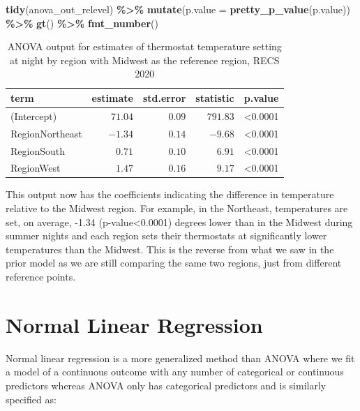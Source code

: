 \documentclass[
]{krantz}
\makeatletter
\newenvironment{Shaded}{\begin{snugshade}}{\end{snugshade}}
\newcommand{\AttributeTok}[1]{\textcolor[rgb]{0.27,0.27,0.27}{#1}}
\newcommand{\FunctionTok}[1]{\textcolor[rgb]{0.27,0.27,0.27}{\textbf{#1}}}
\newcommand{\NormalTok}[1]{#1}
\newcommand{\SpecialCharTok}[1]{\textcolor[rgb]{0.43,0.43,0.43}{\textbf{#1}}}
\newenvironment{kframe}{%
\medskip{}
\setlength{\fboxsep}{.8em}
 \def\at@end@of@kframe{}%
 \ifinner\ifhmode%
  \def\at@end@of@kframe{\end{minipage}}%
  \begin{minipage}{\columnwidth}%
 \fi\fi%
 \def\FrameCommand##1{\hskip\@totalleftmargin \hskip-\fboxsep
 \colorbox{shadecolor}{##1}\hskip-\fboxsep
     \hskip-\linewidth \hskip-\@totalleftmargin \hskip\columnwidth}%
 \MakeFramed {\advance\hsize-\width
   \@totalleftmargin\z@ \linewidth\hsize
   \@setminipage}}%
 {\par\unskip\endMakeFramed%
 \at@end@of@kframe}
\renewenvironment{Shaded}{\begin{kframe}}{\end{kframe}}
\makeatother
\begin{document}
\begin{Shaded}
\begin{Highlighting}[]
\FunctionTok{tidy}\NormalTok{(anova\_out\_relevel) }\SpecialCharTok{\%\textgreater{}\%}
  \FunctionTok{mutate}\NormalTok{(}\AttributeTok{p.value =} \FunctionTok{pretty\_p\_value}\NormalTok{(p.value)) }\SpecialCharTok{\%\textgreater{}\%}
  \FunctionTok{gt}\NormalTok{() }\SpecialCharTok{\%\textgreater{}\%}
  \FunctionTok{fmt\_number}\NormalTok{()}
\end{Highlighting}
\end{Shaded}



\begin{longtable}{lrrrl}
\caption{\label{tab:model-anova-ex-tab}ANOVA output for estimates of thermostat temperature setting at night by region with Midwest as the reference region, RECS 2020}\\
\toprule
term & estimate & std.error & statistic & p.value \\ 
\midrule\relax
(Intercept) & $71.04$ & $0.09$ & $791.83$ & <0.0001 \\ 
RegionNortheast & $-1.34$ & $0.14$ & $-9.68$ & <0.0001 \\ 
RegionSouth & $0.71$ & $0.10$ & $6.91$ & <0.0001 \\ 
RegionWest & $1.47$ & $0.16$ & $9.17$ & <0.0001 \\ 
\bottomrule
\end{longtable}

This output now has the coefficients indicating the difference in temperature relative to the Midwest region. For example, in the Northeast, temperatures are set, on average, -1.34 (p-value\textless0.0001) degrees lower than in the Midwest during summer nights and each region sets their thermostats at significantly lower temperatures than the Midwest. This is the reverse from what we saw in the prior model as we are still comparing the same two regions, just from different reference points.

\hypertarget{normal-linear-regression}{%
\section{Normal Linear Regression}\label{normal-linear-regression}}

Normal linear regression is a more generalized method than ANOVA where we fit a model of a continuous outcome with any number of categorical or continuous predictors whereas ANOVA only has categorical predictors and is similarly specified as:
\end{document}
